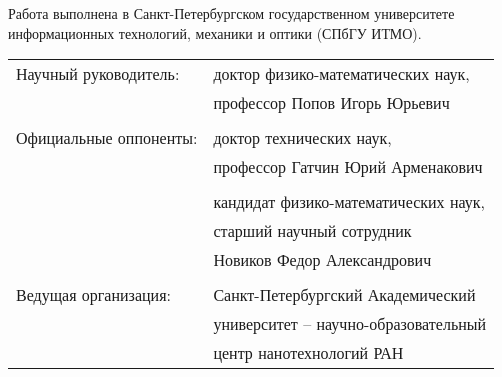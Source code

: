 \documentclass[12pt,a4paper]{article}
\date{}
\theoremstyle{definition}
\theoremstyle{plain}
\begin{document}
\newpage
{}


\thispagestyle{empty}
\addtocounter{page}{1}

\newpage

\thispagestyle{empty}
\noindent 
Работа выполнена в Санкт-Петербургском государственном университете информационных технологий, механики и оптики (СПбГУ ИТМО).

\vspace*{\fill}

\noindent
\begin{tabular}{ll}
Научный руководитель:  & доктор физико-математических наук,  				 \\
                       & профессор Попов Игорь Юрьевич         				 \\
                       & \\
Официальные оппоненты: & доктор технических наук,   				 \\
                       & профессор Гатчин Юрий Арменакович         \\
                       \\
                       & кандидат физико-математических наук,\\
                       & старший научный сотрудник\\
                       & Новиков Федор Александрович\\
                       & \\
Ведущая организация:   & Санкт-Петербургский Академический \\ 
					   & университет -- научно-образовательный \\
					   & центр нанотехнологий РАН\\
\end{tabular}
\end{document}
